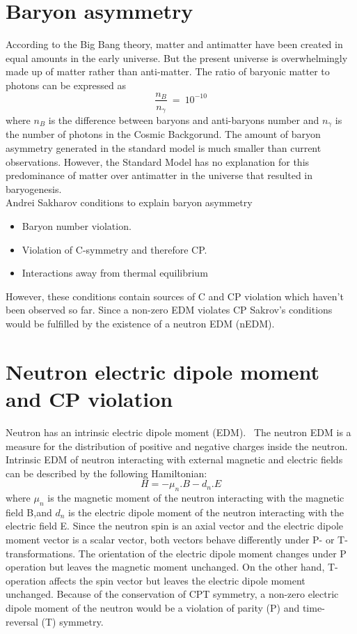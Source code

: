 \section{Baryon asymmetry}
According to the Big Bang theory, matter and antimatter have been created in equal amounts in the early
universe. But the present universe is overwhelmingly made up of matter rather than anti-matter. The ratio of baryonic matter to photons can be expressed as
\begin{equation}
  \frac{ n_B }{n_\gamma}~ = ~10^{-10}    
\end{equation}
where $n_B$ is the difference between  baryons and anti-baryons number and $n_\gamma$ is the number of photons in the Cosmic Backgorund. The amount of baryon asymmetry generated in the standard model is much smaller than current observations. However,  the Standard Model has no explanation for this predominance of matter over antimatter in the universe  that resulted in baryogenesis.\\
Andrei Sakharov conditions to explain  baryon asymmetry\cite{budker2013optical}\cite{PhysRevLett.10.531} 
\begin{itemize}
    \item Baryon number violation.
    \item Violation of C-symmetry and therefore CP.
    \item Interactions away from thermal equilibrium
\end{itemize}
However, these conditions contain sources of C and CP violation which haven't been observed so far. Since a non-zero EDM violates CP Sakrov's conditions  would be fulfilled by the existence of a neutron EDM (nEDM).


 \section{Neutron electric dipole moment and CP violation }  
 Neutron has an intrinsic electric dipole moment (EDM).  ~The neutron EDM is a measure for the distribution of positive and negative charges inside the neutron\cite{wiki:yyy}. Intrinsic EDM of neutron interacting with external magnetic and electric fields can be described by the following Hamiltonian:
\begin{equation}\label{my_first_eqn}  
  H=-\mu_n.B-d_n.E
\end{equation}
where $\mu_n$ is the magnetic moment of the neutron interacting with the magnetic field B,and $d_n$ is the electric dipole moment of the neutron interacting with the electric field E.
Since the neutron spin is an axial vector and the electric dipole moment vector is a scalar
vector, both vectors behave differently under P- or T-transformations.  The orientation of the electric dipole moment changes under P operation  but leaves the magnetic moment unchanged. On the other hand, T-operation affects the spin vector but leaves the electric dipole moment unchanged.
 Because of the conservation of CPT symmetry, a non-zero electric dipole moment of the neutron would be a violation of parity (P) and time-reversal (T) symmetry.

